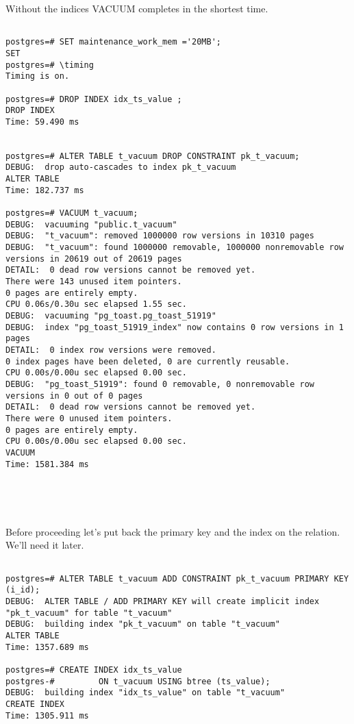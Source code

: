 Without the indices VACUUM completes in the shortest time.\newline

\begin{lstlisting}[style=pgsql]

postgres=# SET maintenance_work_mem ='20MB';
SET
postgres=# \timing
Timing is on.

postgres=# DROP INDEX idx_ts_value ;
DROP INDEX
Time: 59.490 ms


postgres=# ALTER TABLE t_vacuum DROP CONSTRAINT pk_t_vacuum;
DEBUG:  drop auto-cascades to index pk_t_vacuum
ALTER TABLE
Time: 182.737 ms

postgres=# VACUUM t_vacuum;
DEBUG:  vacuuming "public.t_vacuum"
DEBUG:  "t_vacuum": removed 1000000 row versions in 10310 pages
DEBUG:  "t_vacuum": found 1000000 removable, 1000000 nonremovable row versions in 20619 out of 20619 pages
DETAIL:  0 dead row versions cannot be removed yet.
There were 143 unused item pointers.
0 pages are entirely empty.
CPU 0.06s/0.30u sec elapsed 1.55 sec.
DEBUG:  vacuuming "pg_toast.pg_toast_51919"
DEBUG:  index "pg_toast_51919_index" now contains 0 row versions in 1 pages
DETAIL:  0 index row versions were removed.
0 index pages have been deleted, 0 are currently reusable.
CPU 0.00s/0.00u sec elapsed 0.00 sec.
DEBUG:  "pg_toast_51919": found 0 removable, 0 nonremovable row versions in 0 out of 0 pages
DETAIL:  0 dead row versions cannot be removed yet.
There were 0 unused item pointers.
0 pages are entirely empty.
CPU 0.00s/0.00u sec elapsed 0.00 sec.
VACUUM
Time: 1581.384 ms





\end{lstlisting}

Before proceeding let's put back the primary key and the index on the relation. We'll need it later.

\begin{lstlisting}[style=pgsql]

postgres=# ALTER TABLE t_vacuum ADD CONSTRAINT pk_t_vacuum PRIMARY KEY (i_id);
DEBUG:  ALTER TABLE / ADD PRIMARY KEY will create implicit index "pk_t_vacuum" for table "t_vacuum"
DEBUG:  building index "pk_t_vacuum" on table "t_vacuum"
ALTER TABLE
Time: 1357.689 ms

postgres=# CREATE INDEX idx_ts_value
postgres-#         ON t_vacuum USING btree (ts_value);
DEBUG:  building index "idx_ts_value" on table "t_vacuum"
CREATE INDEX
Time: 1305.911 ms

\end{lstlisting}


